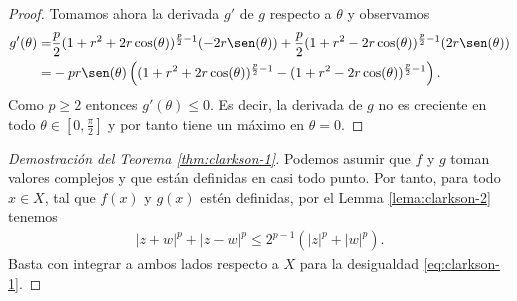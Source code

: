 \begin{proof}
    Tomamos ahora la derivada $g'$ de $ g $ respecto a $ \theta $ y observamos
    \begin{align}
        g'(\theta) = &\frac{p}{2}(1 + r^2 + 2r \cos(\theta))^{\frac{p}{2}-1} (-2r \sen(\theta)) + \frac{p}{2}(1 + r^2 - 2r \cos(\theta))^{\frac{p}{2}-1} (2r \sen(\theta)) \\
        = &-pr \sen(\theta) \left((1+r^2 + 2r\cos(\theta))^{\frac{p}{2}-1} - (1+r^2 - 2r\cos(\theta))^{\frac{p}{2}-1}\right).
    \end{align}
    Como $ p \geq 2 $ entonces $g'(\theta) \leq 0 $. Es decir, la derivada de $ g $ no es creciente en todo $ \theta \in \left[0, \frac{\pi}{2}\right] $ y por tanto tiene un máximo en $ \theta = 0 $.
\end{proof}

\begin{proof}[Demostración del Teorema \ref{thm:clarkson-1}]
    Podemos asumir que $ f $ y $ g $ toman valores complejos y que están definidas en casi todo punto. Por tanto, para todo $ x \in X $, tal que $ f(x) $ y $ g(x) $ estén definidas, por el Lemma \ref{lema:clarkson-2} tenemos
    \begin{align}
        \left| z + w \right|^p + \left| z - w \right|^p \leq 2^{p-1} \left( |z|^p + |w|^p \right).
    \end{align}
    Basta con integrar a ambos lados respecto a $ X $ para la desigualdad \eqref{eq:clarkson-1}.
\end{proof}

